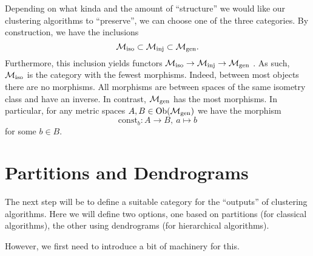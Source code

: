 Depending on what kinda and the amount of ``structure'' we would like our clustering algorithms to ``preserve'', we can choose one of the three categories.
By construction, we have the inclusions
\begin{equation}
    \label{eq:inclusions_of_finite_metric_space_categories}
    {\mathcal{M}_\mathrm{iso}} \subset {\mathcal{M}_\mathrm{inj}} \subset {\mathcal{M}_\mathrm{gen}}.
\end{equation}
Furthermore, this inclusion yields functors ${\mathcal{M}_\mathrm{iso}} \to {\mathcal{M}_\mathrm{inj}} \to {\mathcal{M}_\mathrm{gen}}$ \cite[Def.~1.2.18]{Leinster2014-dc}.
As such, ${\mathcal{M}_\mathrm{iso}}$ is the category with the fewest morphisms. Indeed, between most objects there are no morphisms.
All morphisms are between spaces of the same isometry class and have an inverse.
In contrast, ${\mathcal{M}_\mathrm{gen}}$ has the most morphisms. In particular, for any metric spaces $A,B \in \mathrm {Ob}({\mathcal{M}_\mathrm{gen}})$ we have the morphism
$$
\mathrm{const}_b\colon A \to B, \ a \mapsto b
$$
for some $b \in B$.

\section{Partitions and Dendrograms}
\label{section__partitions}

The next step will be to define a suitable category for the ``outputs'' of clustering algorithms. Here we will define two options, one based on partitions (for classical algorithms), the other using dendrograms (for hierarchical algorithms).

However, we first need to introduce a bit of machinery for this.


